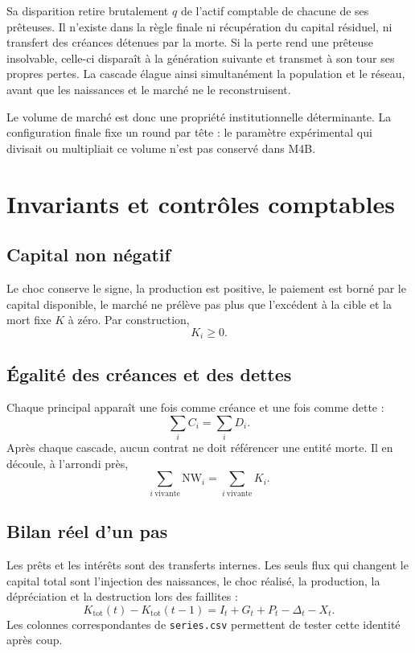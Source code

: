 \documentclass[11pt,a4paper]{article}
\newcommand{\code}[1]{\texttt{#1}}
\newcommand{\NW}{\mathrm{NW}}
\begin{document}
Sa disparition retire brutalement $q$ de l'actif comptable de chacune de ses
prêteuses. Il n'existe dans la règle finale ni récupération du capital
résiduel, ni transfert des créances détenues par la morte. Si la perte rend
une prêteuse insolvable, celle-ci disparaît à la génération suivante et
transmet à son tour ses propres pertes. La cascade élague ainsi simultanément
la population et le réseau, avant que les naissances et le marché ne le
reconstruisent.

Le volume de marché est donc une propriété institutionnelle déterminante. La
configuration finale fixe un round par tête : le paramètre expérimental qui
divisait ou multipliait ce volume n'est pas conservé dans M4B.

\section{Invariants et contrôles comptables}

\subsection{Capital non négatif}

Le choc conserve le signe, la production est positive, le paiement est borné
par le capital disponible, le marché ne prélève pas plus que l'excédent à la
cible et la mort fixe $K$ à zéro. Par construction,
\[
K_i\geq0.
\]

\subsection{Égalité des créances et des dettes}

Chaque principal apparaît une fois comme créance et une fois comme dette :
\[
\sum_i C_i=\sum_i D_i.
\]
Après chaque cascade, aucun contrat ne doit référencer une entité morte. Il
en découle, à l'arrondi près,
\[
\sum_{i\ \mathrm{vivante}}\NW_i
=\sum_{i\ \mathrm{vivante}}K_i.
\]

\subsection{Bilan réel d'un pas}

Les prêts et les intérêts sont des transferts internes. Les seuls flux qui
changent le capital total sont l'injection des naissances, le choc réalisé,
la production, la dépréciation et la destruction lors des faillites :
\[
\boxed{
K_{\mathrm{tot}}(t)-K_{\mathrm{tot}}(t-1)
=I_t+G_t+P_t-\Delta_t-X_t.}
\]
Les colonnes correspondantes de \code{series.csv} permettent de tester cette
identité après coup.
\end{document}
